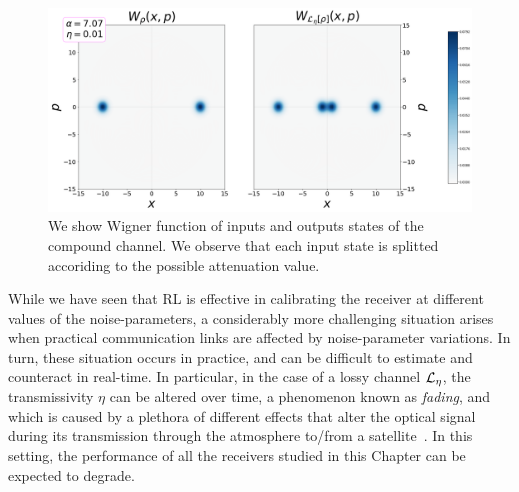 \begin{figure}[t!]
    \centering
    \includegraphics[width=1.\textwidth]{Figures/318/dist1wigner.png}
    \caption{We show Wigner function of inputs and outputs states of the compound channel. We observe that each input state is splitted accoriding to the possible attenuation value.}
    \label{fig:wignercomp}
\end{figure}

While we have seen that RL is effective in calibrating the receiver at different values of the noise-parameters, a considerably more challenging situation arises when practical communication links are affected by noise-parameter variations. In turn, these situation occurs in practice, and can be difficult to estimate and counteract in real-time. In particular, in the case of a lossy channel ${\cal L}_\eta$, the transmissivity $\eta$ can be altered over time, a phenomenon known as \textit{fading}, and which is caused by a plethora of different effects that alter the optical signal during its transmission through the atmosphere to/from a satellite~\cite{Dequal2020,Andrews2005,Usenko2012a,Pirandola2021,Pirandola2021a,Vasylyev2011,Vasylyev2017}. In this setting, the performance of all the receivers studied in this Chapter can be expected to degrade.

